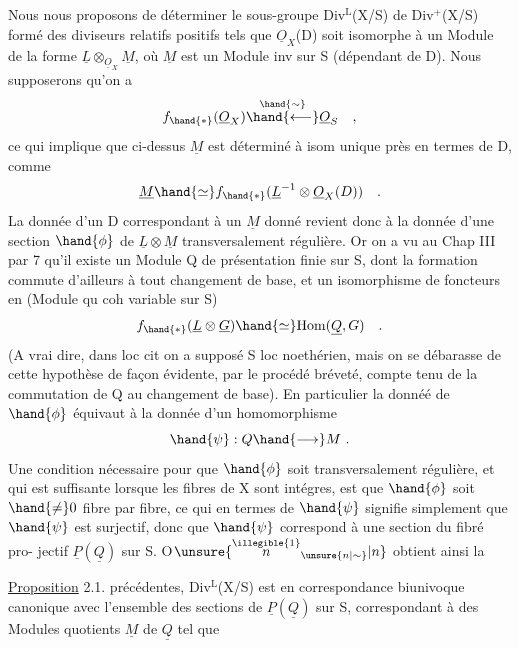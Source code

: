 
Nous nous proposons de déterminer le sous-groupe Div$^{\mathrm{L}}$(X/S) de Div$^{+}$(X/S)
formé des diviseurs relatifs positifs tels que $\underline{O}_X$(D) soit isomorphe à
un Module de la forme $\underline{L}\otimes_{\underline{O}_X}\underline{M}$, où $\underline{M}$ est un Module inv sur S (dépendant de
D). Nous supposerons qu'on a
\[ f_{\hand{*}}(\underline{O}_X)\overset{\hand{\sim}}{\hand{\longleftarrow}}\underline{O}_S \quad , \]
ce qui implique que ci-dessus $\underline{M}$ est déterminé à isom unique près en termes
de D, comme
\[ \underline{M}\hand{\simeq} f_{\hand{*}}(\underline{L}^{-1}\otimes\underline{O}_X(D)) \quad . \]
La donnée d'un D correspondant à un $\underline{M}$ donné revient donc à la donnée
d'une section $\hand{\phi}$ de $\underline{L}\otimes\underline{M}$ transversalement régulière. Or on a vu au
Chap III par 7  qu'il  existe un Module Q de
présentation finie sur S, dont la formation commute d'ailleurs à tout
changement de base, et un isomorphisme de foncteurs en  (Module qu coh
variable sur S)
\[ f_{\hand{*}}(\underline{L}\otimes\underline{G})\hand{\simeq} \mathrm{Hom}(\underline{Q},G) \quad . \]
(A vrai dire, dans loc cit on a supposé S loc noethérien, mais on se
débarasse de cette hypothèse de façon évidente, par le procédé bréveté,
compte tenu de la commutation de Q au changement de base). En particulier
la donnéé de $\hand{\phi}$ équivaut à  la donnée d'un homomorphisme
\[ \hand{\psi} : Q \hand{\longrightarrow} M \ . \]
Une condition nécessaire pour que $\hand{\phi}$ soit transversalement régulière, et
qui est suffisante lorsque les fibres de X sont intégres, est que $\hand{\phi}$ soit
$\hand{\neq} 0$  fibre par fibre, ce qui en termes de $\hand{\psi}$ signifie simplement que
$\hand{\psi}$ est surjectif, donc que  $\hand{\psi}$ correspond à une section du fibré pro-%
jectif $\underline{P}(\underline{Q})$ sur S. O$\unsure{\overset{\illegible{1}}{n}_{\unsure{n|\sim}}|n}$ obtient ainsi la

\uline{Proposition} 2.1.   précédentes, Div$^{\mathrm{L}}$(X/S) est
en correspondance biunivoque canonique avec l'ensemble des  sections
de $\underline{P}(\underline{Q})$ sur S, correspondant à des Modules quotients $\underline{M}$ de $\underline{Q}$ tel que

